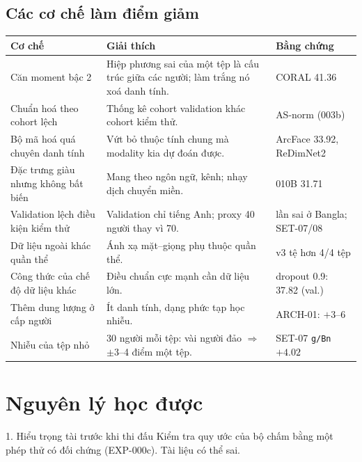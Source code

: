 \documentclass[11pt,a4paper,oneside]{report}
\newcommand{\id}[1]{\texttt{#1}}
\begin{document}
\subsection{Các cơ chế làm điểm giảm}
\begin{center}
\begin{tabular}{>{\raggedright}p{4.2cm}>{\raggedright}p{6.9cm}>{\raggedright\arraybackslash}p{3.6cm}}
\toprule
Cơ chế & Giải thích & Bằng chứng \\
\midrule
Căn moment bậc 2 & Hiệp phương sai của một tệp là cấu trúc giữa các người; làm trắng nó xoá danh tính. & CORAL 41.36 \\
Chuẩn hoá theo cohort lệch & Thống kê cohort validation khác cohort kiểm thử. & AS-norm (003b) \\
Bộ mã hoá quá chuyên danh tính & Vứt bỏ thuộc tính chung mà modality kia dự đoán được. & ArcFace 33.92, ReDimNet2 \\
Đặc trưng giàu nhưng không bất biến & Mang theo ngôn ngữ, kênh; nhạy dịch chuyển miền. & 010B 31.71 \\
Validation lệch điều kiện kiểm thử & Validation chỉ tiếng Anh; proxy 40 người thay vì 70. & 5 lần sai ở Bangla; SET-07/08 \\
Dữ liệu ngoài khác quần thể & Ánh xạ mặt--giọng phụ thuộc quần thể. & v3 tệ hơn 4/4 tệp \\
Công thức của chế độ dữ liệu khác & Điều chuẩn cực mạnh cần dữ liệu lớn. & dropout 0.9: 37.82 (val.) \\
Thêm dung lượng ở cấp người & Ít danh tính, dạng phức tạp học nhiễu. & ARCH-01: $+3$--6 \\
Nhiễu của tệp nhỏ & 30 người mỗi tệp: vài người đảo $\Rightarrow$ $\pm3$--4 điểm một tệp. & SET-07 \id{g/Bn} $+4.02$ \\
\bottomrule
\end{tabular}
\end{center}

\section{Nguyên lý học được}
\label{sec:principles}

\begin{principle}{1. Hiểu trọng tài trước khi thi đấu}
Kiểm tra quy ước của bộ chấm bằng một phép thử có đối chứng (EXP-000c). Tài liệu có thể sai.
\end{principle}
\end{document}
